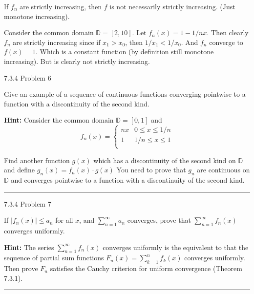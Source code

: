 \documentclass[11pt]{article}
\begin{document}
If $f_n$ are strictly increasing, then $f$ is not necessarily strictly increasing.
(Just monotone increasing).

Consider the common domain $\mathbb{D} = [2, 10]$. Let $f_n(x) = 1 - 1/nx$.
Then clearly $f_n$ are strictly increasing since if $x_1 > x_0$, then $1/x_1 < 1/x_0$.
And $f_n$ converge to $f(x) = 1$. Which is a constant function (by definition still monotone increasing).
But is clearly not strictly increasing.





 7.3.4 Problem 6

Give an example of a sequence of continuous functions converging pointwise to a function
with a discontinuity of the second kind.

\textbf{Hint:} Consider the common domain $\mathbb{D} = [0,1]$ and 
$$f_n (x) = \begin{cases}
    nx & 0 \leq x \leq 1/n \\
    1 & 1/n \leq x \leq 1 \\
\end{cases}$$

Find another function $g(x)$ which has a discontinuity of the second kind on $\mathbb{D}$ and define 
$g_n(x) = f_n(x) \cdot g(x)$
You need to prove that $g_n$ are continuous on $\mathbb{D}$ and converges pointwise to a function with a 
discontinuity of the second kind.

\hrule





 7.3.4 Problem 7

If $|f_n(x)| \leq a_n$ for all $x$, and $\sum_{n = 1}^ \infty a_n$ converges,
prove that $\sum_{n = 1}^ \infty f_n(x)$ converges uniformly.

\textbf{Hint:}
The series $\sum_{n = 1}^ \infty f_n(x)$ converges uniformly is the equivalent to that the sequence
of partial sum functions $F_n(x) = \sum_{k = 1} ^n f_k(x)$ converges uniformly. 
Then prove $F_n$ satisfies the Cauchy criterion for uniform convergence (Theorem 7.3.1).

\hrule
\end{document}
